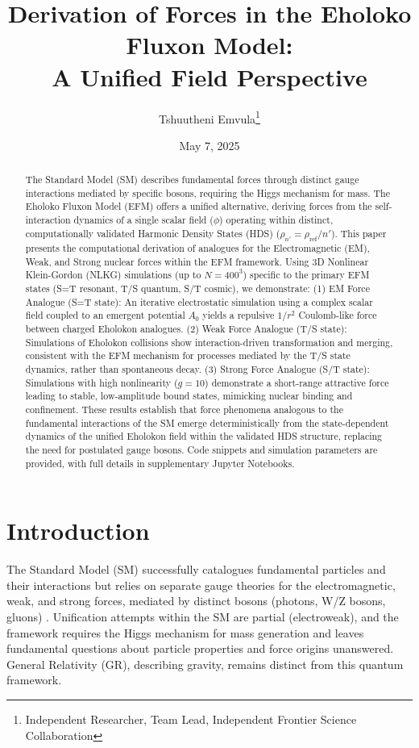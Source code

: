 \documentclass[11pt]{article}
\title{Derivation of Forces in the Eholoko Fluxon Model: \\ A Unified Field Perspective}
\author{Tshuutheni Emvula\thanks{Independent Researcher, Team Lead, Independent Frontier Science Collaboration}}
\date{May 7, 2025} %
\begin{document}
\maketitle

\begin{abstract}
The Standard Model (SM) describes fundamental forces through distinct gauge interactions mediated by specific bosons, requiring the Higgs mechanism for mass. The Eholoko Fluxon Model (EFM) offers a unified alternative, deriving forces from the self-interaction dynamics of a single scalar field (\(\phi\)) operating within distinct, computationally validated Harmonic Density States (HDS) (\(\rho_{n'} = \rho_{\text{ref}}/n'\)). This paper presents the computational derivation of analogues for the Electromagnetic (EM), Weak, and Strong nuclear forces within the EFM framework. Using 3D Nonlinear Klein-Gordon (NLKG) simulations (up to \(N=400^3\)) specific to the primary EFM states (S=T resonant, T/S quantum, S/T cosmic), we demonstrate: (1) EM Force Analogue (S=T state): An iterative electrostatic simulation using a complex scalar field coupled to an emergent potential \(A_0\) yields a repulsive \(1/r^2\) Coulomb-like force between charged Eholokon analogues. (2) Weak Force Analogue (T/S state): Simulations of Eholokon collisions show interaction-driven transformation and merging, consistent with the EFM mechanism for processes mediated by the T/S state dynamics, rather than spontaneous decay. (3) Strong Force Analogue (S/T state): Simulations with high nonlinearity (\(g=10\)) demonstrate a short-range attractive force leading to stable, low-amplitude bound states, mimicking nuclear binding and confinement. These results establish that force phenomena analogous to the fundamental interactions of the SM emerge deterministically from the state-dependent dynamics of the unified Eholokon field within the validated HDS structure, replacing the need for postulated gauge bosons. Code snippets and simulation parameters are provided, with full details in supplementary Jupyter Notebooks.
\end{abstract}

\section{Introduction}
The Standard Model (SM) successfully catalogues fundamental particles and their interactions but relies on separate gauge theories for the electromagnetic, weak, and strong forces, mediated by distinct bosons (photons, W/Z bosons, gluons) \citep{sm_review_placeholder}. Unification attempts within the SM are partial (electroweak), and the framework requires the Higgs mechanism for mass generation and leaves fundamental questions about particle properties and force origins unanswered. General Relativity (GR), describing gravity, remains distinct from this quantum framework.
\end{document}
